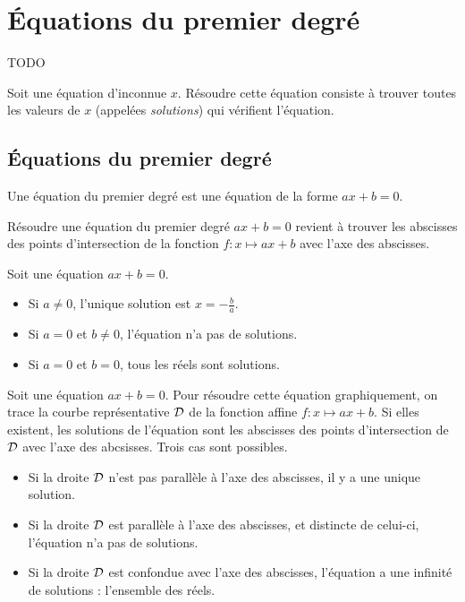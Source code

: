 \section{Équations du premier degré}

TODO

\begin{definition}
  Soit une équation d'inconnue $x$. Résoudre cette équation consiste à trouver
  toutes les valeurs de $x$ (appelées \emph{solutions}) qui vérifient
  l'équation.
\end{definition}

\subsection{Équations du premier degré}

\begin{definition}
  Une équation du premier degré est une équation de la forme $ax+b=0$.
\end{definition}

\begin{remarque}
  Résoudre une équation du premier degré $ax+b=0$ revient à trouver les abscisses des points d'intersection de la fonction $f:x\mapsto ax+b$ avec l'axe des abscisses.
\end{remarque}

\begin{propriete}
  Soit une équation $ax+b=0$.

  \begin{itemize}
    \item Si $a\neq0$, l'unique solution est $x=-\frac{b}{a}$.
    \item Si $a=0$ et $b\neq0$, l'équation n'a pas de solutions.
    \item Si $a=0$ et $b=0$, tous les réels sont solutions.
  \end{itemize}
\end{propriete}

\begin{methode}
  Soit une équation $ax+b=0$. Pour résoudre cette équation graphiquement, on trace la courbe représentative $\cal D$ de la fonction affine $f:x\mapsto ax+b$.
  Si elles existent, les solutions de l'équation sont les abscisses des points d'intersection de $\cal D$ avec l'axe des abcsisses.
  Trois cas sont possibles.
  \begin{itemize}
    \item Si la droite $\cal D$ n'est pas parallèle à l'axe des abscisses, il y a une unique solution.
    \item Si la droite $\cal D$ est parallèle à l'axe des abscisses, et distincte de celui-ci, l'équation n'a pas de solutions.
    \item Si la droite $\cal D$ est confondue avec l'axe des abscisses, l'équation a une infinité de solutions : l'ensemble des réels.
  \end{itemize}
\end{methode}


